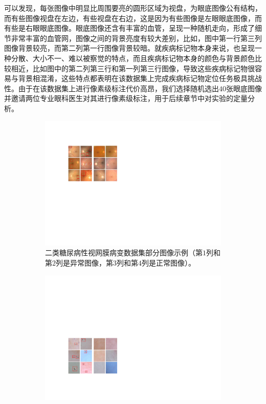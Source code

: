 可以发现，每张图像中明显比周围要亮的圆形区域为视盘，为眼底图像公有结构，而有些图像视盘在左边，有些视盘在右边，这是因为有些图像是左眼眼底图像，而有些是右眼眼底图像。眼底图像还含有丰富的血管，呈现一种随机走向，形成了细节非常丰富的血管网，图像之间的背景亮度有较大差别，比如，图中第一行第三列图像背景较亮，而第二列第一行图像背景较暗。就疾病标记物本身来说，也呈现一种分散、大小不一、难以被察觉的特点，而且疾病标记物本身的颜色与背景颜色比较相近，比如图中的第二列第三行和第一列第三行图像，导致这些疾病标记物很容易与背景相混淆，这些特点都表明在该数据集上完成疾病标记物定位任务极具挑战性。由于在该数据集上进行像素级标注代价高昂，我们选择随机选出$40$张眼底图像并邀请两位专业眼科医生对其进行像素级标注，用于后续章节中对实验的定量分析。

\begin{figure}[h!]
	\centering
	\begin{subfigure}{0.48\textwidth}
		\centering
		\includegraphics[width=1\textwidth]{figure/bin_dr_ds_example}
		\caption{二类糖尿病性视网膜病变数据集部分图像示例（第$1$列和第$2$列是异常图像，第$3$列和第$4$列是正常图像）。}
		\label{subfig:bin_dr_ds_example}
	\end{subfigure}
	\quad
	\begin{subfigure}{0.48\textwidth}
		\centering
		\includegraphics[width=1\textwidth]{figure/bin_simulate_skin_example}

\end{subfigure}
\end{figure}
